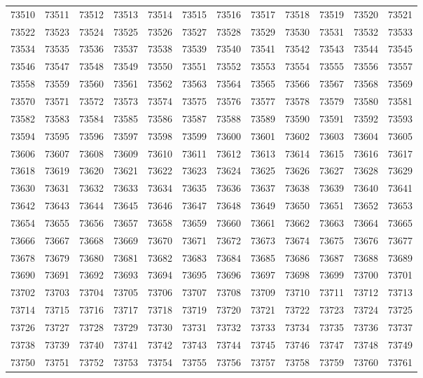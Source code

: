 \begin{center}
\begin{longtable}{llllllllllll}
73510 &73511 &73512 &73513 &73514 &73515 &73516 &73517 &73518 &73519 &73520 &73521 \\
73522 &73523 &73524 &73525 &73526 &73527 &73528 &73529 &73530 &73531 &73532 &73533 \\
73534 &73535 &73536 &73537 &73538 &73539 &73540 &73541 &73542 &73543 &73544 &73545 \\
73546 &73547 &73548 &73549 &73550 &73551 &73552 &73553 &73554 &73555 &73556 &73557 \\
73558 &73559 &73560 &73561 &73562 &73563 &73564 &73565 &73566 &73567 &73568 &73569 \\
73570 &73571 &73572 &73573 &73574 &73575 &73576 &73577 &73578 &73579 &73580 &73581 \\
73582 &73583 &73584 &73585 &73586 &73587 &73588 &73589 &73590 &73591 &73592 &73593 \\
73594 &73595 &73596 &73597 &73598 &73599 &73600 &73601 &73602 &73603 &73604 &73605 \\
73606 &73607 &73608 &73609 &73610 &73611 &73612 &73613 &73614 &73615 &73616 &73617 \\
73618 &73619 &73620 &73621 &73622 &73623 &73624 &73625 &73626 &73627 &73628 &73629 \\
73630 &73631 &73632 &73633 &73634 &73635 &73636 &73637 &73638 &73639 &73640 &73641 \\
73642 &73643 &73644 &73645 &73646 &73647 &73648 &73649 &73650 &73651 &73652 &73653 \\
73654 &73655 &73656 &73657 &73658 &73659 &73660 &73661 &73662 &73663 &73664 &73665 \\
73666 &73667 &73668 &73669 &73670 &73671 &73672 &73673 &73674 &73675 &73676 &73677 \\
73678 &73679 &73680 &73681 &73682 &73683 &73684 &73685 &73686 &73687 &73688 &73689 \\
73690 &73691 &73692 &73693 &73694 &73695 &73696 &73697 &73698 &73699 &73700 &73701 \\
73702 &73703 &73704 &73705 &73706 &73707 &73708 &73709 &73710 &73711 &73712 &73713 \\
73714 &73715 &73716 &73717 &73718 &73719 &73720 &73721 &73722 &73723 &73724 &73725 \\
73726 &73727 &73728 &73729 &73730 &73731 &73732 &73733 &73734 &73735 &73736 &73737 \\
73738 &73739 &73740 &73741 &73742 &73743 &73744 &73745 &73746 &73747 &73748 &73749 \\
73750 &73751 &73752 &73753 &73754 &73755 &73756 &73757 &73758 &73759 &73760 &73761 \\

\end{longtable}
\end{center}
